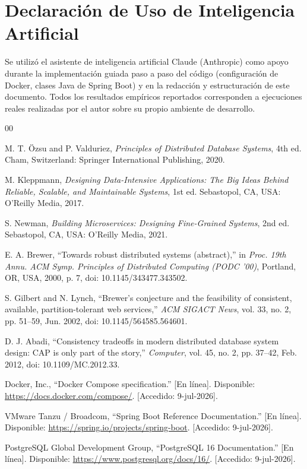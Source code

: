 \documentclass[conference]{IEEEtran}
\begin{document}
\section*{Declaraci\'on de Uso de Inteligencia Artificial}
Se utiliz\'o el asistente de inteligencia artificial Claude (Anthropic) como
apoyo durante la implementaci\'on guiada paso a paso del c\'odigo (configuraci\'on
de Docker, clases Java de Spring Boot) y en la redacci\'on y estructuraci\'on
de este documento. Todos los resultados emp\'iricos reportados corresponden a
ejecuciones reales realizadas por el autor sobre su propio ambiente de
desarrollo.

\begin{thebibliography}{00}

 M. T. \"Ozsu and P. Valduriez, \emph{Principles of
Distributed Database Systems}, 4th ed. Cham, Switzerland: Springer
International Publishing, 2020.

 M. Kleppmann, \emph{Designing Data-Intensive
Applications: The Big Ideas Behind Reliable, Scalable, and Maintainable
Systems}, 1st ed. Sebastopol, CA, USA: O'Reilly Media, 2017.

 S. Newman, \emph{Building Microservices: Designing
Fine-Grained Systems}, 2nd ed. Sebastopol, CA, USA: O'Reilly Media, 2021.

 E. A. Brewer, ``Towards robust distributed systems
(abstract),'' in \emph{Proc. 19th Annu. ACM Symp. Principles of Distributed
Computing (PODC '00)}, Portland, OR, USA, 2000, p. 7, doi:
10.1145/343477.343502.

 S. Gilbert and N. Lynch, ``Brewer's conjecture and the
feasibility of consistent, available, partition-tolerant web services,''
\emph{ACM SIGACT News}, vol. 33, no. 2, pp. 51--59, Jun. 2002, doi:
10.1145/564585.564601.

 D. J. Abadi, ``Consistency tradeoffs in modern
distributed database system design: CAP is only part of the story,''
\emph{Computer}, vol. 45, no. 2, pp. 37--42, Feb. 2012, doi:
10.1109/MC.2012.33.

 Docker, Inc., ``Docker Compose specification.''
[En l\'inea]. Disponible: \url{https://docs.docker.com/compose/}.
[Accedido: 9-jul-2026].

 VMware Tanzu / Broadcom, ``Spring Boot Reference
Documentation.'' [En l\'inea]. Disponible:
\url{https://spring.io/projects/spring-boot}. [Accedido: 9-jul-2026].

 PostgreSQL Global Development Group, ``PostgreSQL 16
Documentation.'' [En l\'inea]. Disponible:
\url{https://www.postgresql.org/docs/16/}. [Accedido: 9-jul-2026].

\end{thebibliography}
\end{document}
